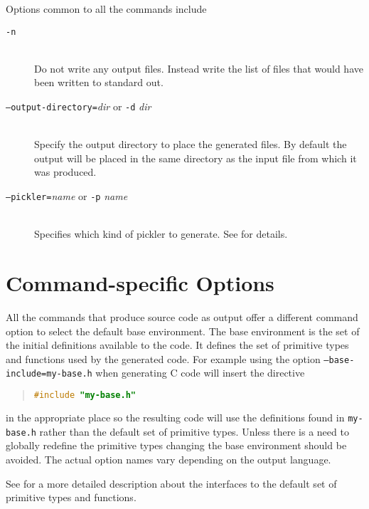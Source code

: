 Options common to all the commands include
\begin{description}
  \item[\normalfont\texttt{-n}] \mbox{}\\
    Do not write any output files.
    Instead write the list of files that would have been written to standard out.
  \item[\normalfont\texttt{--output-directory=}\textit{dir} or \texttt{-d} \textit{dir}] \mbox{}\\
    Specify the output directory to place the generated files.
    By default the output will be placed in the same directory as the
    input file from which it was produced.
  \item[\normalfont\texttt{--pickler=}\textit{name} or \texttt{-p} \textit{name}] \mbox{}\\
    Specifies which kind of pickler to generate.
    See  for details.
\end{description}%

\section*{Command-specific Options}

All the commands that produce source code as output offer a different
command option to select the default base environment.
The base environment is the set of the initial definitions available to the code.
It defines the set of primitive types and functions used by the generated code.
For example using the option \texttt{--base-include=my-base.h}
when generating C code will insert the directive
\begin{quote}\begin{lstlisting}[language=c]
#include "my-base.h"
\end{lstlisting}\end{quote}%
in the appropriate place so the resulting code will use the definitions found in
\texttt{my-base.h} rather than the default set of primitive types.
Unless there is a need to globally redefine
the primitive types changing the base environment should be avoided.
The actual option names vary depending on the output language.

See  for a more detailed description about the interfaces
to the default set of primitive types and functions.

